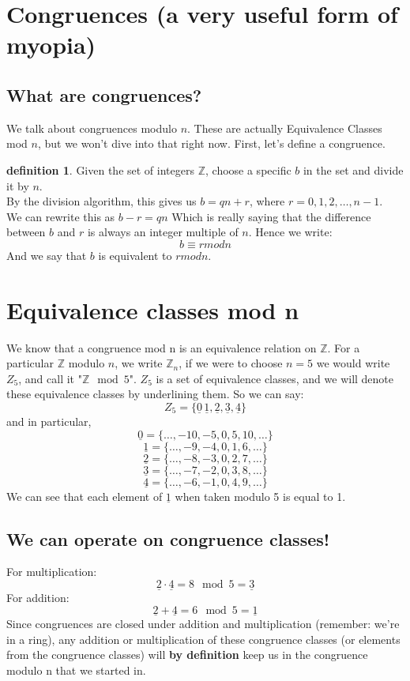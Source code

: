 \documentclass[10pt]{article}
\newcommand{\Z}{\mathbb{Z}}
\theoremstyle{definition}
\newtheorem{definition}[theorem]{definition}
\theoremstyle{remark}
\def\Z{\mathbb{ Z}}
\begin{document}
\section{Congruences (a very useful form of myopia)}
\subsection{What are congruences?}
We talk about congruences modulo $n$.  These are actually Equivalence Classes mod $n$, but we won't dive into that right now.  First, let's define a congruence.
\begin{definition}
Given the set of integers $\Z$, choose a specific $b$ in the set and divide it by $n$.\\
By the division algorithm, this gives us $b = qn + r$, where $r = 0, 1, 2, \ldots, n-1$.\\
We can rewrite this as $b-r = qn$
Which is really saying that the difference between $b$ and $r$ is always an integer multiple of $n$.  Hence we write: $$ b\equiv r mod n$$
And we say that $b$ is equivalent to $r mod n$.
\end{definition}
\pagebreak
\section{Equivalence classes mod n}
We know that a congruence mod n is an equivalence relation on $\mathbb{Z}$.  For a particular $\Z$ modulo $n$, we write $\Z_n$, if we were to choose $n=5$ we would write $Z_5$, and call it "$\Z \mod 5$".  $Z_5$ is a set of equivalence classes, and we will denote these equivalence classes by underlining them.  So we can say:
$$ Z_5 = \{\underline{0}\,\underline{1},\underline{2},\underline{3},\underline{4}\} $$
and in particular,
$$\underline{0} = \{\ldots,-10,-5,0,5,10,\ldots\}$$
$$\underline{1} = \{\ldots,-9,-4,0,1,6,\ldots\}$$
$$\underline{2} = \{\ldots,-8,-3,0,2,7,\ldots\}$$
$$\underline{3} = \{\ldots,-7,-2,0,3,8,\ldots\}$$
$$\underline{4} = \{\ldots,-6,-1,0,4,9,\ldots\}$$
We can see that each element of $\underline{1}$ when taken modulo 5 is equal to 1.  
\subsection{We can operate on congruence classes!}
For multiplication:
$$\underline{2} \cdot \underline{4} = 8 \mod 5 = \underline{3}$$
For addition:
$$\underline{2} + \underline{4} = 6 \mod 5 = \underline{1}$$
Since congruences are closed under addition and multiplication (remember: we're in a ring), any addition or multiplication of these congruence classes (or elements from the congruence classes) will \textbf{by definition} keep us in the congruence modulo n that we started in.
\end{document}
